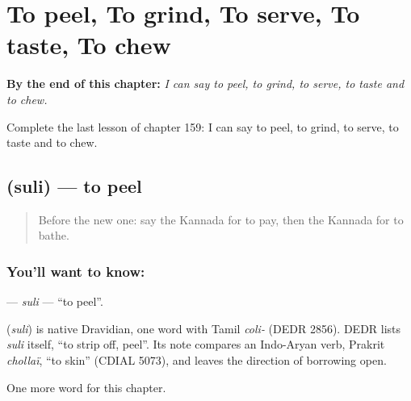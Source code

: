 
\chapter{To peel, To grind, To serve, To taste, To chew}
\label{ch:ka-to-peel-to-grind-to-serve-to-taste-to-chew}

\begin{chapteropening}
\textbf{By the end of this chapter:} \emph{I can say to peel, to grind, to serve, to taste and to chew.}

Complete the last lesson of chapter 159: I can say to peel, to grind, to serve, to taste and to chew.
\end{chapteropening}

\section[\texorpdfstring{\kn{ಸುಲಿ} (suli)}{ಸುಲಿ (suli)}]{ (suli) — to peel}

\label{lesson:KA-C159-suli}



\begin{quote}
Before the new one: say the Kannada for to pay, then the Kannada for to bathe.
\end{quote}

\subsection*{You'll want to know: }
\textbf{} — \emph{suli} — \textquotedblleft{}to peel\textquotedblright{}.

\begin{cousinweb}
\textbf{} (\emph{suli}) is native Dravidian, one word with Tamil \emph{coli-} (DEDR 2856). DEDR lists \emph{suli} itself, \textquotedblleft{}to strip off, peel\textquotedblright{}. Its note compares an Indo-Aryan verb, Prakrit \emph{chollaï}, \textquotedblleft{}to skin\textquotedblright{} (CDIAL 5073), and leaves the direction of borrowing open.
\end{cousinweb}

\begin{grammarlens}[title={What you've built}]
One more word for this chapter.
\end{grammarlens}

